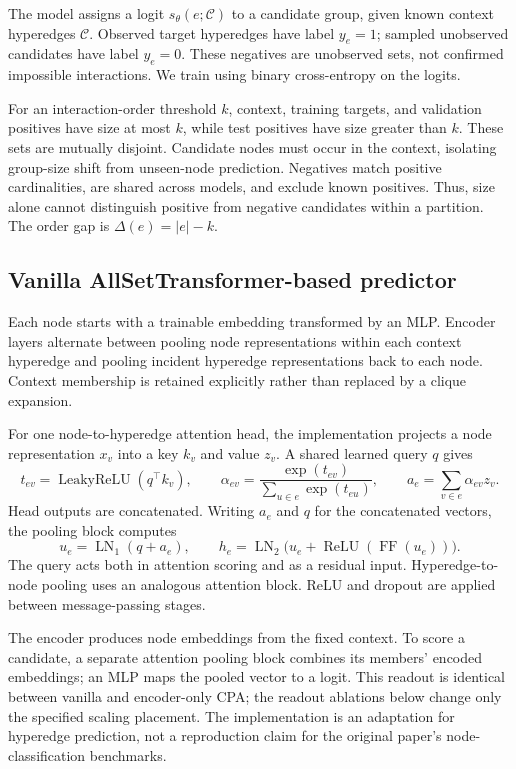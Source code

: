 \documentclass{article}
\begin{document}
The model assigns a logit $s_\theta(e;\mathcal C)$ to a candidate group, given known context hyperedges $\mathcal C$. Observed target hyperedges have label $y_e=1$; sampled unobserved candidates have label $y_e=0$. These negatives are unobserved sets, not confirmed impossible interactions. We train using binary cross-entropy on the logits.

For an interaction-order threshold $k$, context, training targets, and validation positives have size at most $k$, while test positives have size greater than $k$. These sets are mutually disjoint. Candidate nodes must occur in the context, isolating group-size shift from unseen-node prediction. Negatives match positive cardinalities, are shared across models, and exclude known positives. Thus, size alone cannot distinguish positive from negative candidates within a partition. The order gap is $\Delta(e)=|e|-k$.

\subsection{Vanilla AllSetTransformer-based predictor}
Each node starts with a trainable embedding transformed by an MLP. Encoder layers alternate between pooling node representations within each context hyperedge and pooling incident hyperedge representations back to each node. Context membership is retained explicitly rather than replaced by a clique expansion.

For one node-to-hyperedge attention head, the implementation projects a node representation $x_v$ into a key $k_v$ and value $z_v$. A shared learned query $q$ gives
\begin{equation}
 t_{ev}=\operatorname{LeakyReLU}(q^\top k_v),\qquad
 \alpha_{ev}=\frac{\exp(t_{ev})}{\sum_{u\in e}\exp(t_{eu})},\qquad
 a_e=\sum_{v\in e}\alpha_{ev}z_v.
\end{equation}
Head outputs are concatenated. Writing $a_e$ and $q$ for the concatenated vectors, the pooling block computes
\begin{equation}
 u_e=\operatorname{LN}_1(q+a_e),\qquad
 h_e=\operatorname{LN}_2\bigl(u_e+\operatorname{ReLU}(\operatorname{FF}(u_e))\bigr).
 \label{eq:block}
\end{equation}
The query acts both in attention scoring and as a residual input. Hyperedge-to-node pooling uses an analogous attention block. ReLU and dropout are applied between message-passing stages.

The encoder produces node embeddings from the fixed context. To score a candidate, a separate attention pooling block combines its members' encoded embeddings; an MLP maps the pooled vector to a logit. This readout is identical between vanilla and encoder-only CPA; the readout ablations below change only the specified scaling placement. The implementation is an adaptation for hyperedge prediction, not a reproduction claim for the original paper's node-classification benchmarks.
\end{document}
